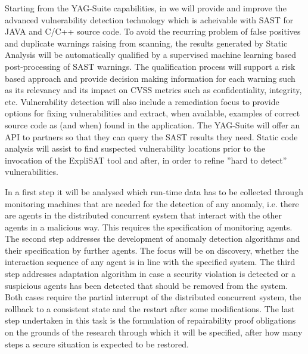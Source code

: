 \begin{Workpackage}{\thewpno}
\begin{Task}
\end{Task}

\begin{Task}

\TaskResults{%
}
\TaskHeader{}

Starting from the YAG-Suite capabilities, in \theTask we will provide and improve the advanced vulnerability detection technology which is acheivable with SAST for JAVA and C/C++ source code. To avoid the recurring problem of false positives and duplicate warnings raising from scanning, the results generated by Static Analysis will be automatically qualified by a supervised machine learning based post-processing of SAST warnings. 
The qualification process will support a risk based approach and provide decision making information for each warning such as its relevancy and its impact on CVSS metrics such as confidentiality, integrity, etc.
Vulnerability detection will also include a remediation focus to provide options for fixing vulnerabilities and extract, when available, examples of correct source code as (and when) found in the application.
The YAG-Suite will offer an API to partners so that they can query the SAST results they need.
Static code analysis will assist to find suspected vulnerability locations prior to the invocation of the ExpliSAT tool and after, in order to refine ”hard to detect” vulnerabilities.


\end{Task}

\begin{Task}

\TaskResults{%
}
\TaskHeader{}
In a first step it will be analysed which run-time data has to be collected through monitoring machines that are needed for the detection of any anomaly, i.e. there are agents in the distributed concurrent system that interact with the other agents in a malicious way. This requires the specification of monitoring agents. The second step addresses the development of anomaly detection algorithms and their specification by further agents. The focus will be on discovery, whether the interaction sequence of any agent is in line with the specified system. The third step
addresses adaptation algorithm in case a security violation is detected or a suspicious agents
has been detected that should be removed from the system. Both cases require the partial interrupt of the distributed concurrent system, the rollback to a consistent state and the restart after some modifications. The last step undertaken in this task is the formulation of repairability proof obligations on the grounds of the research through which it will be specified, after how many steps a secure situation is expected to be restored.
\end{Task}








\end{Workpackage}
